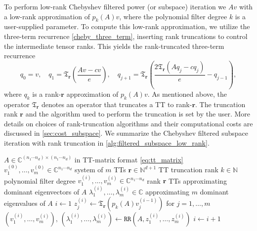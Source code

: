 \documentclass[10pt,preprint]{elsarticle}
\def\T{\mathfrak{T}}
\def\r{\bm r}
\begin{document}
To perform low-rank Chebyshev filtered power (or subspace) iteration we $Av$ with a low-rank approximation of $p_k(A)v$, where the polynomial filter degree $k$ is a user-supplied parameter. 
To compute this low-rank approximation, we utilize the three-term recurrence \eqref{cheby_three_term}, inserting rank truncations to control the intermediate tensor ranks. This yields the rank-truncated three-term recurrence 
\begin{equation} \label{eq:three_term_cheby_trunc}
q_0 = v, \quad 
q_1 = \T_{\r}\left(\frac{Av-cv}{e}\right), \quad
q_{j+1} = \T_{\r}\left(
\frac{2\T_{\r}\left(Aq_j - cq_j\right)}{e} - q_{j-1}\right), 
\end{equation}
where $q_k$ is a rank-$\r$ approximation of $p_k(A)v$. 
As mentioned above, the operator $\mathfrak{T}_{\bm r}$ denotes an operator that truncates a TT to rank-$\bm r$. The truncation rank $\bm r$ and the algorithm used to perform the truncation is set by the user. More details on choices of rank-truncation algorithms and their computational costs are discussed in \cref{sec:cost_subspace}. We summarize the Chebyshev filtered subspace iteration with rank truncation in \cref{alg:filtered_subspace_low_rank}. 

\begin{algorithm}
\caption{Chebyshev filtered subspace iteration with rank truncation}
\label{alg:filtered_subspace_low_rank}
\begin{algorithmic}[1]
\Require
\Statex \hspace{1em} 
$A \in \mathbb{C}^{(n_1 \cdots n_d) \times (n_1 \cdots n_d)}$ in TT-matrix format \eqref{eq:tt_matrix}
\Statex \hspace{1em} $v_1^{(0)}, \ldots, v_m^{(0)} \in \mathbb{C}^{n_1 \cdots n_d}$ system of $m$ TTs 
\Statex \hspace{1em} $\bm r \in \mathbb{N}^{d+1}$ TT truncation rank
\Statex \hspace{1em} $k \in \mathbb{N}$ polynomial filter degree
\Ensure
\Statex \hspace{1em} 
$v_1^{(i)}, \ldots, v_m^{(i)} \in \mathbb{C}^{n_1 \cdots n_d}$ rank $\bm r$ TTs approximating dominant eigenvectors of $A$ 
\Statex \hspace{1em} 
$\lambda_1^{(i)}, \ldots, \lambda_m^{(i)} \in \mathbb{C}$ approximating $m$ dominant eigenvalues of $A$
\vspace{0.5em}
\State $i \gets 1$
    \State $z_j^{(i)} \gets \mathfrak{T}_{\bm r}\!\left(p_k(A) v_j^{(i-1)} \right)$ 
           \quad for $j = 1,\ldots,m$
    \State $(v_1^{(i)}, \ldots, v_m^{(i)}), \, (\lambda_1^{(i)}, \ldots, \lambda_m^{(i)}) 
           \gets \texttt{RR}(A, z_1^{(i)}, \ldots, z_m^{(i)})$
    \State $i \gets i+1$
\EndWhile
\end{algorithmic}
\end{algorithm}
\end{document}
